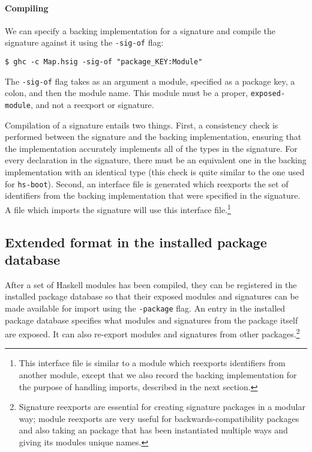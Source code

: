 \documentclass{article}
\newcommand{\Red}[1]{{\color{red} #1}}
\begin{document}
\paragraph{Compiling} We can specify a backing implementation for
a signature and compile the signature against it using the
\texttt{-sig-of} flag:

\begin{verbatim}
$ ghc -c Map.hsig -sig-of "package_KEY:Module"
\end{verbatim}

The \texttt{-sig-of} flag takes as an argument a module, specified
as a package key, a colon, and then the module name.  \Red{This module
must be a proper, \texttt{exposed-module}, and not a reexport or
signature.}

Compilation of a signature entails two things.  First, a consistency
check is performed between the signature and the backing
implementation, ensuring that the implementation accurately implements
all of the types in the signature.  For every declaration in the
signature, there must be an equivalent one in the backing implementation
with an identical type (this check is quite similar to the one used
for \texttt{hs-boot}).  Second, an interface file is generated
which reexports the set of identifiers from the backing
implementation that were specified in the signature. A file which
imports the signature will use this interface file.\footnote{This
interface file is similar to a module which reexports identifiers
from another module, except that we also record the backing implementation
for the purpose of handling imports, described in the next section.}

\subsection{Extended format in the installed package database}

After a set of Haskell modules has been compiled, they can be registered
in the installed package database so that their exposed modules and
signatures can be made available for import using the \texttt{-package}
flag.  An entry in the installed package database specifies what modules
and signatures from the package itself are exposed. It can also
re-export modules and signatures from other packages.\footnote{Signature
reexports are essential for creating signature packages in a modular
way; module reexports are very useful for backwards-compatibility
packages and also taking an package that has been instantiated multiple
ways and giving its modules unique names.}
\end{document}
